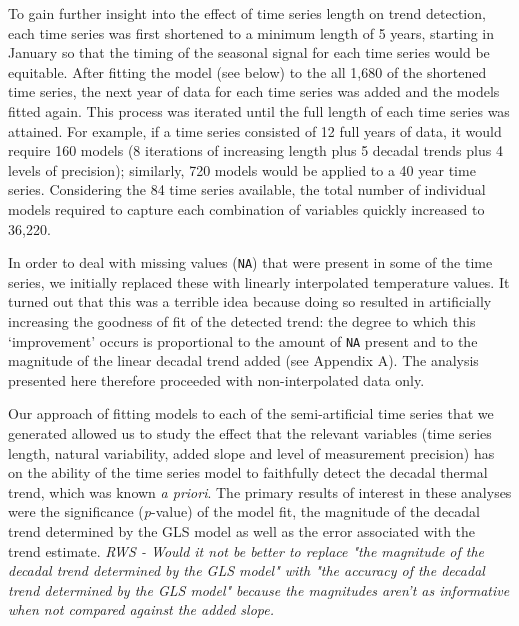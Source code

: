 \documentclass{ametsoc}
\begin{document}
To gain further insight into the effect of time series length on trend detection, each time series was first shortened to a minimum length of 5 years, starting in January so that the timing of the seasonal signal for each time series would be equitable. After fitting the model (see below) to the all 1,680 of the shortened time series, the next year of data for each time series was added and the models fitted again. This process was iterated until the full length of each time series was attained. For example, if a time series consisted of 12 full years of data, it would require 160 models (8 iterations of increasing length plus 5 decadal trends plus 4 levels of precision); similarly, 720 models would be applied to a 40 year time series. Considering the 84 time series available, the total number of individual models required to capture each combination of variables quickly increased to 36,220.

In order to deal with missing values (\texttt{NA}) that were present in some of the time series, we initially replaced these with linearly interpolated temperature values. It turned out that this was a terrible idea because doing so resulted in artificially increasing the goodness of fit of the detected trend: the degree to which this `improvement' occurs is proportional to the amount of \texttt{NA} present and to the magnitude of the linear decadal trend added (see Appendix A). The analysis presented here therefore proceeded with non-interpolated data only.

Our approach of fitting models to each of the semi-artificial time series that we generated allowed us to study the effect that the relevant variables (time series length, natural variability, added slope and level of measurement precision) has on the ability of the time series model to faithfully detect the decadal thermal trend, which was known \emph{a priori}. The primary results of interest in these analyses were the significance (\emph{p}-value) of the model fit, the magnitude of the decadal trend determined by the GLS model as well as the error associated with the trend estimate. 
\emph{RWS - Would it not be better to replace "the magnitude of the decadal trend determined by the GLS model" with "the accuracy of the decadal trend determined by the GLS model" because the magnitudes aren't as informative when not compared against the added slope.}
\end{document}
